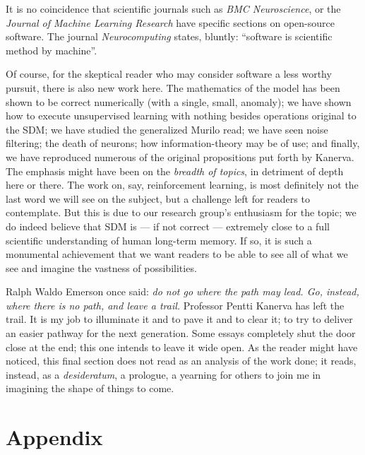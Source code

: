 It is no coincidence that scientific journals such as \emph{BMC Neuroscience}, or the \emph{Journal of Machine Learning Research} have specific sections on open-source software. The journal \emph{Neurocomputing} states, bluntly: “software is scientific method by machine”.

Of course, for the skeptical reader who may consider software a less worthy pursuit, there is also new work here.  The mathematics of the model has been shown to be correct numerically (with a single, small, anomaly); we have shown how to execute unsupervised learning with nothing besides operations original to the SDM; we have studied the generalized Murilo read; we have seen noise filtering; the death of neurons; how information-theory may be of use; and finally, we have reproduced numerous of the original propositions put forth by Kanerva.  The emphasis might have been on the \emph{breadth of topics}, in detriment of depth here or there.  The work on, say, reinforcement learning, is most definitely not the last word we will see on the subject, but a challenge left for readers to contemplate. But this is due to our research group's enthusiasm for the topic; we do indeed believe that SDM is --- if not correct --- extremely close to a full scientific understanding of human long-term memory.  If so, it is such a monumental achievement that we want readers to be able to see all of what we see and imagine the vastness of possibilities.

Ralph Waldo Emerson once said: \emph{do not go where the path may lead. Go, instead, where there is no path, and leave a trail.}  Professor Pentti Kanerva has left the trail.  It is my job to illuminate it and to pave it and to clear it; to try to deliver an easier pathway for the next generation.  Some essays completely shut the door close at the end; this one intends to leave it wide open.  As the reader might have noticed, this final section does not read as an analysis of the work done; it reads, instead, as a \emph{desideratum}, a prologue, a yearning for others to join me in imagining the shape of things to come.











\chapter{Appendix}

